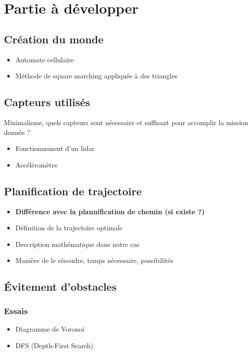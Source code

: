 \documentclass[../main.tex]{subfiles}
\begin{document}
\section{Partie à développer}

\subsection*{Création du monde}
\begin{itemize}
    \item Automate cellulaire
    \item Méthode de square marching appliquée à des triangles
\end{itemize}

\subsection*{Capteurs utilisés}
Minimalisme, quels capteurs sont nécessaire et suffisant pour accomplir la mission donnée ?
\begin{itemize}
    \item Fonctionnement d'un lidar
    \item Accéléromètre
\end{itemize}

\subsection*{Planification de trajectoire}
\begin{itemize}
	\item \textbf{Différence avec la plannification de chemin (si existe ?)}
    \item Définition de la trajectoire optimale
    \item Description mathématique dans notre cas
    \item Manière de le résoudre, temps nécessaire, possibilités
\end{itemize}

\subsection*{Évitement d'obstacles}
\subsubsection*{Essais}
\begin{itemize}
    \item Diagramme de Voronoi
    \item DFS (Depth-First Search)    
\end{itemize}
\end{document}
